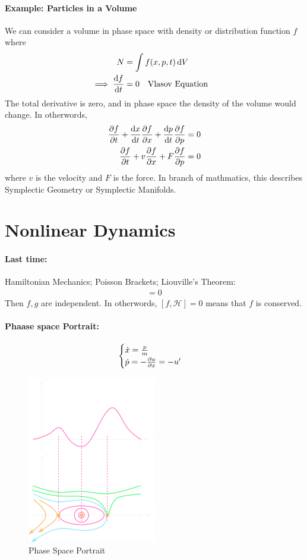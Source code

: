 \documentclass[../main.tex]{subfiles}
\begin{document}
\paragraph*{Example: Particles in a Volume}
We can consider a volume in phase space with density or distribution function $f$ where
\begin{align*}
    N &= \int f(x, p, t) \dd{V} \\
    \implies \dv{f}{t} &= 0 \qqtext{Vlasov Equation}
\end{align*}
The total derivative is zero, and in phase space the density of the volume would change. In
otherwords,
\begin{align*}
    \pdv{f}{t} + \dv{x}{t} \pdv{f}{x} + \dv{p}{t} \pdv{f}{p} &= 0 \\
    \pdv{f}{t} + v \pdv{f}{x} + F \pdv{f}{p} &=0 
\end{align*}
where $v$ is the velocity and $F$ is the force.
In branch of mathmatics, this describes Symplectic Geometry or Symplectic Manifolds.

\newpage
\section*{Nonlinear Dynamics}
\paragraph*{Last time:} Hamiltonian Mechanics; Poisson Brackets; Liouville's Theorem:
\begin{align*}
    [f, g] = 0
\end{align*}
Then $f, g$ are independent. In otherwords, $[f, \mathcal{H}] = 0$ means that $f$ is conserved.
\paragraph*{Phaase space Portrait:} 
\begin{align*}
    \begin{cases}
        \dot x = \frac{p}{m} \\
        \dot p = - \pdv{u}{x} = -u'
    \end{cases}
\end{align*}
\begin{figure}[ht]
    \centering
    \includegraphics[width=0.5\textwidth]{phase_portrait.png}
    \caption{Phase Space Portrait}
\end{figure}
\end{document}

